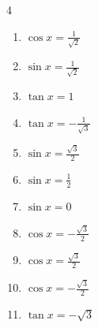 \begin{multicols}{4}
\begin{enumerate}
  \item $\displaystyle \cos{x}  = \frac{1}{\sqrt{2}}$


  \item $\displaystyle \sin{x}  = \frac{1}{\sqrt{2}}$


  \item $\displaystyle \tan{x}  = 1$


  \item $\displaystyle \tan{x}  = -\frac{1}{\sqrt{3}}$


  \item $\displaystyle \sin{x}  = \frac{\sqrt{3}}{2}$


  \item $\displaystyle \sin{x}  = \frac{1}{2}$


  \item $\displaystyle \sin{x}  = 0$


\columnbreak %

\resetques

  \item $\displaystyle \cos{x}  = -\frac{\sqrt{3}}{2}$


  \item $\displaystyle \cos{x}  = \frac{\sqrt{3}}{2}$


  \item $\displaystyle \cos{x}  = -\frac{\sqrt{3}}{2}$


  \item $\displaystyle \tan{x}  = -\sqrt{3}$



\end{enumerate}
\end{multicols}

